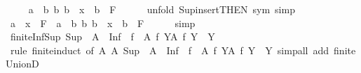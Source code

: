 \begin{isabellebody}
\ \isamarkupfalse%
\ {\isachardoublequoteopen}{\isachardot}{\kern0pt}{\isachardot}{\kern0pt}{\isachardot}{\kern0pt}\ {\isacharequal}{\kern0pt}\ {\isasymSqunion}{\isacharbraceleft}{\kern0pt}a\ {\isasymsqinter}\ b\ {\isacharbar}{\kern0pt}b{\isachardot}{\kern0pt}\ b\ {\isacharequal}{\kern0pt}\ x\ {\isasymor}\ b\ {\isasymin}\ F{\isacharbraceright}{\kern0pt}{\isachardoublequoteclose}\isanewline
\ \ \ \ \isamarkupfalse%
\ {\isacharparenleft}{\kern0pt}unfold\ Sup{\isacharunderscore}{\kern0pt}insert{\isacharbrackleft}{\kern0pt}THEN\ sym{\isacharbrackright}{\kern0pt}{\isacharcomma}{\kern0pt}\ simp{\isacharparenright}{\kern0pt}\isanewline
\ \ \isamarkupfalse%
\ \isamarkupfalse%
\ {\isachardoublequoteopen}a\ {\isasymsqinter}\ {\isacharparenleft}{\kern0pt}x\ {\isasymsqunion}\ {\isasymSqunion}F{\isacharparenright}{\kern0pt}\ {\isacharequal}{\kern0pt}\ {\isasymSqunion}{\isacharbraceleft}{\kern0pt}a\ {\isasymsqinter}\ b\ {\isacharbar}{\kern0pt}b{\isachardot}{\kern0pt}\ b\ {\isacharequal}{\kern0pt}\ x\ {\isasymor}\ b\ {\isasymin}\ F{\isacharbraceright}{\kern0pt}{\isachardoublequoteclose}\isanewline
\ \ \ \ \isamarkupfalse%
\ simp\isanewline
{}\isamarkupfalse%
%
\endisatagproof
{\isafoldproof}%
%
\isadelimproof
\isanewline
%
\endisadelimproof
\isanewline
{}\isamarkupfalse%
\ finite{\isacharunderscore}{\kern0pt}Inf{\isacharunderscore}{\kern0pt}Sup{\isacharcolon}{\kern0pt}\ {\isachardoublequoteopen}{\isasymSqinter}{\isacharparenleft}{\kern0pt}Sup\ {\isacharbackquote}{\kern0pt}\ A{\isacharparenright}{\kern0pt}\ {\isasymle}\ {\isasymSqunion}{\isacharparenleft}{\kern0pt}Inf\ {\isacharbackquote}{\kern0pt}\ {\isacharbraceleft}{\kern0pt}f\ {\isacharbackquote}{\kern0pt}\ A\ {\isacharbar}{\kern0pt}f{\isachardot}{\kern0pt}\ {\isasymforall}Y{\isasymin}A{\isachardot}{\kern0pt}\ f\ Y\ {\isasymin}\ Y{\isacharbraceright}{\kern0pt}{\isacharparenright}{\kern0pt}{\isachardoublequoteclose}\isanewline
%
\isadelimproof
%
\endisadelimproof
%
\isatagproof
{}\isamarkupfalse%
\ {\isacharparenleft}{\kern0pt}rule\ finite{\isacharunderscore}{\kern0pt}induct\ {\isacharbrackleft}{\kern0pt}of\ A\ {\isachardoublequoteopen}{\isasymlambda}A{\isachardot}{\kern0pt}\ {\isasymSqinter}{\isacharparenleft}{\kern0pt}Sup\ {\isacharbackquote}{\kern0pt}\ A{\isacharparenright}{\kern0pt}\ {\isasymle}\ {\isasymSqunion}{\isacharparenleft}{\kern0pt}Inf\ {\isacharbackquote}{\kern0pt}\ {\isacharbraceleft}{\kern0pt}f\ {\isacharbackquote}{\kern0pt}\ A\ {\isacharbar}{\kern0pt}f{\isachardot}{\kern0pt}\ {\isasymforall}Y{\isasymin}A{\isachardot}{\kern0pt}\ f\ Y\ {\isasymin}\ Y{\isacharbraceright}{\kern0pt}{\isacharparenright}{\kern0pt}{\isachardoublequoteclose}{\isacharbrackright}{\kern0pt}{\isacharcomma}{\kern0pt}\ simp{\isacharunderscore}{\kern0pt}all\ add{\isacharcolon}{\kern0pt}\ finite{\isacharunderscore}{\kern0pt}UnionD{\isacharparenright}{\kern0pt}\isanewline

\end{isabellebody}
